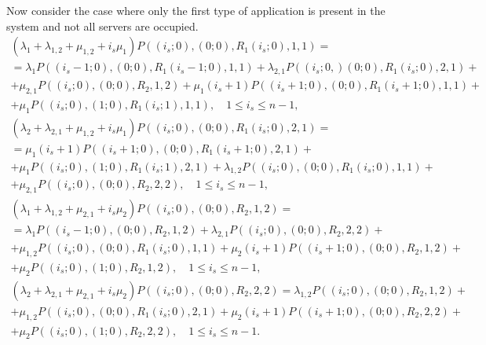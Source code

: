\documentclass[default]{subfiles}
\begin{document}
{%
Now consider the case where only the first type of application is
present in the system and not all servers are occupied.
\begin{multline}
  \left(\lambda_1+\lambda_{1,2}+\mu_{1,2}+i_s\mu_1\right)
  P\left((i_s;0),(0;0),R_1(i_s;0),1,1\right)=\\ = \lambda_1
  P\left((i_s-1;0),(0;0),R_1(i_s-1;0),1,1\right) + \lambda_{2,1}
  P\left((i_s;0,)(0;0),R_1(i_s;0),2,1\right) + \\ + \mu_{2,1}
  P\left((i_s;0),(0;0),R_2,1,2\right)+\mu_1 (i_s+1)
  P\left((i_s+1;0),(0;0),R_1(i_s+1;0),1,1\right) + \\ + \mu_1
  P\left((i_s;0),(1;0),R_1(i_s;1),1,1\right),\quad 1\leqslant
  i_s\leqslant n-1,
\label{eq:2.1}
\end{multline}
\begin{multline}
  \left(\lambda_2+\lambda_{2,1}+\mu_{1,2}+i_s\mu_1\right)
  P\left((i_s;0),(0;0),R_1(i_s;0),2,1\right)=\\ =
  \mu_1 (i_s+1) P\left((i_s+1;0),(0;0),R_1(i_s+1;0),2,1\right) + \\ +\mu_1
  P\left((i_s;0),(1;0),R_1(i_s;1),2,1\right)+ %
  \lambda_{1,2}
  P\left((i_s;0),(0;0),R_1(i_s;0),1,1\right) + \\ +\mu_{2,1}
  P\left((i_s;0),(0;0),R_2,2,2\right), \quad 1\leqslant i_s\leqslant
  n-1,
\label{eq:2.2}
\end{multline}
\begin{multline}
  \left(\lambda_1+\lambda_{1,2}+\mu_{2,1}+i_s\mu_2\right)
  P\left((i_s;0),(0;0),R_2,1,2\right)= \\ = \lambda_1
  P\left((i_s-1;0),(0;0),R_2,1,2\right) + %
  \lambda_{2,1}  P\left((i_s;0),(0;0),R_2,2,2\right) + \\ + \mu_{1,2}
  P\left((i_s;0),(0;0),R_1(i_s;0),1,1\right) + %
  \mu_2 (i_s+1) P\left((i_s+1;0),(0;0),R_2,1,2\right) + \\ + \mu_2
  P\left((i_s;0),(1;0),R_2,1,2\right),\quad 1\leqslant i_s\leqslant
  n-1,
\label{eq:2.3}
\end{multline}
\begin{multline}
  \left(\lambda_2+\lambda_{2,1}+\mu_{2,1}+i_s\mu_2\right)
  P\left((i_s;0),(0;0),R_2,2,2\right)= \lambda_{1,2}
  P\left((i_s;0),(0;0),R_2,1,2\right) + \\ + \mu_{1,2}
  P\left((i_s;0),(0;0),R_1(i_s;0),2,1\right)+ \mu_2 (i_s+1)
  P\left((i_s+1;0),(0;0),R_2,2,2\right) + \\ + \mu_2
  P\left((i_s;0),(1;0),R_2,2,2\right), \quad 1\leqslant i_s\leqslant
  n-1.
\label{eq:2.4}
\end{multline}

}
\end{document}
